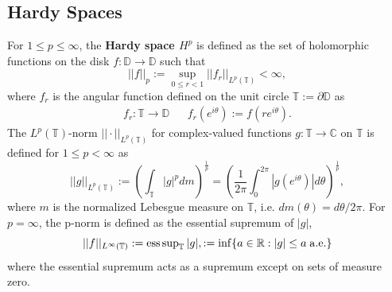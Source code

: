 \begin{appendices}

\newpage
\section{Hardy Spaces}
\label{app:complex_analysis}

For $1\leq p \leq \infty$, the \textbf{Hardy space $H^p$} is defined as the set of holomorphic functions on the disk $f : \mathbb D\rightarrow\mathbb D$ such that
\begin{equation}
    ||f||_p := \sup_{0 \leq r < 1} ||f_{r}||_{L^p(\mathbb T)} < \infty,
    \label{eq:hardy_space_dfn}
\end{equation}
where $f_{r}$ is the angular function defined on the unit circle $\mathbb T := \partial\mathbb D$ as
\begin{align}
    f_{r} : \mathbb T \rightarrow\mathbb D && f_{r}(e^{i\theta}) := f(re^{i\theta}).
\end{align}
The $L^p(\mathbb T)$-norm $||\cdot||_{L^p(\mathbb T)}$ for complex-valued functions $g : \mathbb T\rightarrow \mathbb C$ on $\mathbb T$ is defined for $1\leq p < \infty$ as
\begin{equation}
    ||g||_{L^p(\mathbb T)} := \left( \int_{\mathbb T} |g|^p dm \right)^{\frac{1}{p}} = \left( \frac{1}{2\pi} \int_{0}^{2\pi} |g(e^{i\theta})| d\theta \right)^{\frac{1}{p}},
\end{equation}
where $m$ is the normalized Lebesgue measure on $\mathbb T$, i.e. $dm(\theta) = d\theta / 2\pi$. For $p = \infty$, the p-norm is defined as the essential supremum of $|g|$,
\begin{equation}
    ||f||_{L^\infty(\mathbb T)} := \mathrm{ess}\,\mathrm{sup}_{\mathbb T}\, | g |, := \inf \{ a\in\mathbb R : |g| \leq a\;\mathrm{a.e.}\}
\end{equation}
where the essential supremum acts as a supremum except on sets of measure zero. 


\end{appendices}
